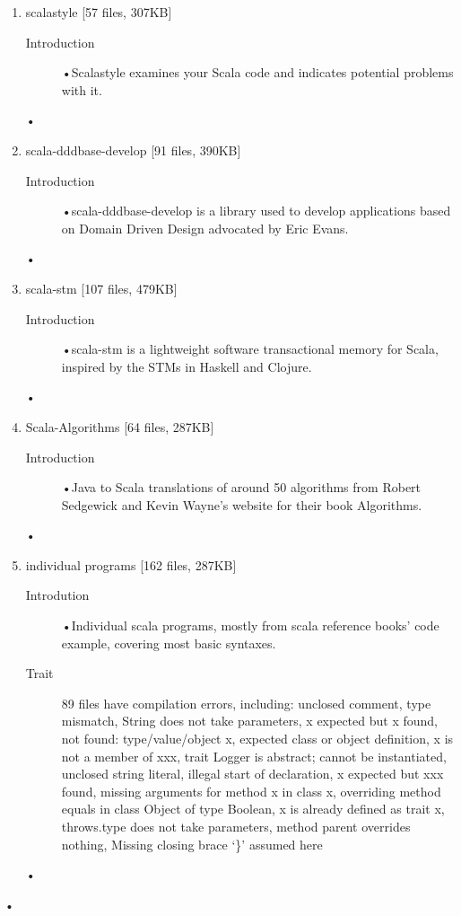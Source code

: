 \documentclass[a4paper]{article}
\begin{document}
\begin{enumerate}
\item scalastyle [57 files, 307KB]
\begin{description}
\item[Introduction]
•Scalastyle examines your Scala code and indicates potential problems with it.
\end{description}•
\item scala-dddbase-develop [91 files, 390KB]
\begin{description}
\item[Introduction]
•scala-dddbase-develop is a library used to develop applications based on Domain Driven Design advocated by Eric Evans.
\end{description}•
\item scala-stm [107 files, 479KB]
\begin{description}
\item[Introduction]
•scala-stm is a lightweight software transactional memory for Scala, inspired by the STMs in Haskell and Clojure.
\end{description}•
\item Scala-Algorithms [64 files, 287KB]
\begin{description}
\item[Introduction]
•Java to Scala translations of around 50 algorithms from Robert Sedgewick and Kevin Wayne's website for their book Algorithms.
\end{description}•
\item individual programs [162 files, 287KB]
\begin{description}
\item[Introdution]
•Individual scala programs, mostly from scala reference books' code example, covering most basic syntaxes.
\item[Trait]
89 files have compilation errors, including: unclosed comment, type mismatch, String does not take parameters, x expected but x found, not found: type/value/object x, expected class or object definition, x is not a member of xxx, trait Logger is abstract; cannot be instantiated, unclosed string literal, illegal start of declaration, x expected but xxx found, missing arguments for method x in class x, overriding method equals in class Object of type Boolean, x is already defined as trait x, throws.type does not take parameters, method parent overrides nothing, Missing closing brace `\}' assumed here
\end{description}•

\end{enumerate}•
\end{document}
